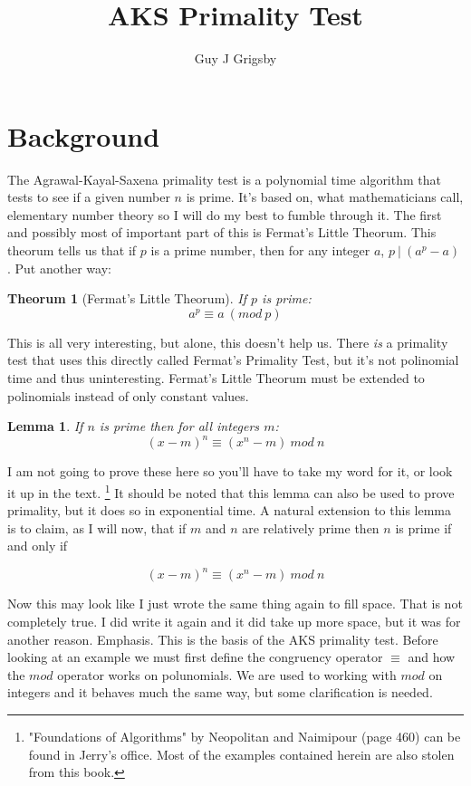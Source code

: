 \documentclass[11pt]{article}
\title{\textbf{AKS Primality Test}}
\author{Guy J Grigsby}
\begin{document}
\maketitle
\vspace{2pc}
\section{Background}
The Agrawal-Kayal-Saxena primality test is a polynomial time algorithm that tests to see if a given number $n$ is prime. It's based on, what mathematicians call, elementary number theory so I will do my best to fumble through it. The first and possibly most of important part of this is Fermat's Little Theorum. This theorum tells us that if $p$ is a prime number, then for any integer $a$, $p\ |\ (a^p - a)$. Put another way:
	
\newtheorem{thm}{Theorum}\label{fermat}
\begin{thm}[Fermat's Little Theorum]
If $p$ is prime:
\begin{equation}
a^p \equiv a\ (mod\ p)
\end{equation}
\end{thm}

This is all very interesting, but alone, this doesn't help us. There \emph{is} a primality test that uses this directly called Fermat's Primality Test, but it's not polinomial time and thus uninteresting. Fermat's Little Theorum must be extended to polinomials instead of only constant values.

\newtheorem{lemma}{Lemma}\label{congruencyLemma}
\begin{lemma}
If $n$ is prime then for all integers $m$:
\begin{equation}
(x-m)^n \equiv (x^n -m)\ mod\ n
\end{equation}
\end{lemma}

I am not going to prove these here so you'll have to take my word for it, or look it up in the text. \footnote{"Foundations of Algorithms" by Neopolitan and Naimipour (page 460) can be found in Jerry's office. Most of the examples contained herein are also stolen from this book.} It should be noted that this lemma can also be used to prove primality, but it does so in exponential time. A natural extension to this lemma is to claim, as I will now, that if $m$ and $n$ are relatively prime then $n$ is prime if and only if 

$$(x-m)^n \equiv (x^n -m)\ mod\ n$$

Now this may look like I just wrote the same thing again to fill space. That is not completely true. I did write it again and it did take up more space, but it was for another reason. Emphasis. This is the basis of the AKS primality test. Before looking at an example we must first define the congruency operator $\equiv$ and how the $mod$ operator works on polunomials. We are used to working with $mod$ on integers and it behaves much the same way, but some clarification is needed. 
\end{document}
